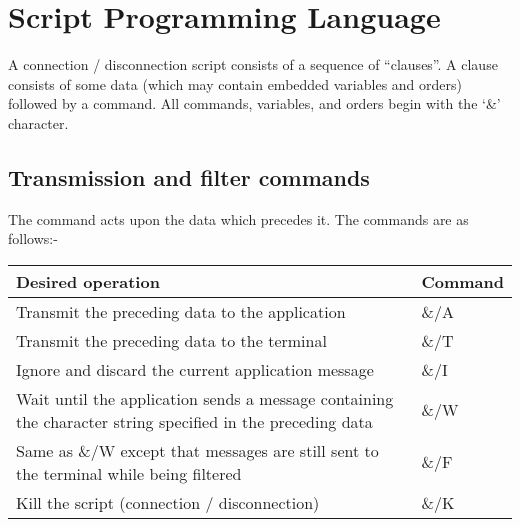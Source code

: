 \documentclass[letterpaper,10pt,english]{sphinxmanual}
\begin{document}
\ignorespaces 

\section{Script Programming Language}
\label{\detokenize{connectivity_guide:script-programming-language}}\label{\detokenize{connectivity_guide:index-117}}
A connection / disconnection script consists of a sequence of “clauses”. A clause consists of some data (which may contain embedded variables and orders) followed by a command. All commands, variables, and orders begin with the ‘\&’ character.

\ignorespaces 

\subsection{Transmission and filter commands}
\label{\detokenize{connectivity_guide:transmission-and-filter-commands}}\label{\detokenize{connectivity_guide:index-118}}
The command acts upon the data which precedes it. The commands are as follows:-


\begin{savenotes}\sphinxattablestart
\centering
\begin{tabulary}{\linewidth}[t]{|T|T|}
\hline
\sphinxstyletheadfamily 
Desired operation
&\sphinxstyletheadfamily 
Command
\\
\hline
Transmit the preceding data to the application
&
\&/A
\\
\hline
Transmit the preceding data to the terminal
&
\&/T
\\
\hline
Ignore and discard the current application message
&
\&/I
\\
\hline
Wait until the application sends a message containing the character string specified in the preceding data
&
\&/W
\\
\hline
Same as \&/W except that messages are still sent to the terminal while being filtered
&
\&/F
\\
\hline
Kill the script (connection / disconnection)
&
\&/K
\\
\hline
\end{tabulary}
\par
\sphinxattableend\end{savenotes}
\end{document}
